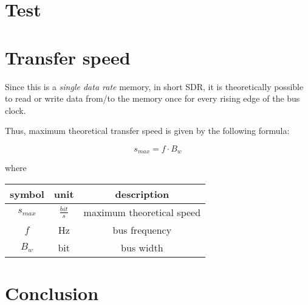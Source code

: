 \documentclass[a4paper,12pt]{article}
\begin{document}
\section{Test}

\section{Transfer speed}
Since this is a \emph{single data rate} memory, in short SDR, it is theoretically possible to read or write data from/to the memory once for every rising edge of the bus clock.

Thus, maximum theoretical transfer speed is given by the following formula:

$$ s_{max} =  f \cdot B_w $$

where

\bgroup
\def\arraystretch{1.5}
\begin{table}[H]
\center
\begin{tabular}{| c | c | c |}\hline
\textbf{symbol} & \textbf{unit} & \textbf{description} \\ \hline
$ s_{max} $ & $ \frac{bit}{s} $ & maximum theoretical speed \\ \hline
$ f $ & Hz & bus frequency \\ \hline
$ B_{w} $ & bit & bus width \\ \hline
\end{tabular}
\end{table}
\egroup

\section{Conclusion}
\end{document}
